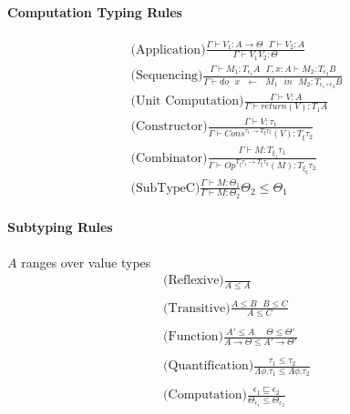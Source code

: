\documentclass[twoside,a4paper,11pt]{article}
\newcommand{\s}{\mbox{ }}
\newcommand{\subtype}{\leq}
\newcommand{\subeffect}{\sqsubseteq}
\newcommand{\typeJudgement}[2]{\Gamma\vdash #1 \colon #2}
\newcommand{\modVarTypeJudgement}[3]{\Gamma, #1 \vdash #2 \colon #3}
\newcommand{\conditionalTypeRule}[4]{\typeRule{#1}{#2}{#3} #4}
\newcommand{\typeRule}[3]{\displaystyle\mbox{#1}\frac{#2}{#3}}
\begin{document}
\paragraph{Computation Typing Rules}

\[\begin{array}{c}
\typeRule{(Application)}{\typeJudgement{V_1}{A \rightarrow \Theta}\s\typeJudgement{V_2}{A}}{\typeJudgement{V_1 V_2}{\Theta}}
\\
\typeRule{(Sequencing)}{\typeJudgement{M_1}{T_{\epsilon_1} A}\s\modVarTypeJudgement{x: A}{M_2}{T_{\epsilon_2} B}}{\typeJudgement{do \s x \s \leftarrow \s M_1 \s in \s M_2}{T_{\epsilon_1 \circ \epsilon_2} B}}
\\
\typeRule{(Unit Computation)}{\typeJudgement{V}{A}}{\typeJudgement{return(V)}{T_{1}A}}
\\
\typeRule{(Constructor)}{\typeJudgement{V}{\tau_1}}{\typeJudgement{ Cons^{\tau_1 \rightarrow T_{\xi} \tau_2}(V)}{T_{\xi} \tau_2}}
\\
\typeRule{(Combinator)}{\typeJudgement{M}{{T_{\xi_1} \tau_1}}}{\typeJudgement{ Op^{T_{\xi} \tau_1 \rightarrow T_{\xi} \tau_2}(M)}{{T_{\xi_2} \tau_2}}}
\\
\conditionalTypeRule{(SubTypeC)}{\typeJudgement{M}{\Theta_1}}{\typeJudgement{M}{\Theta_2}}{\Theta_2 \subtype \Theta_1}
\end{array}\]

\paragraph{Subtyping Rules}

$A$ ranges over value types
\[\begin{array}{c}

\typeRule{(Reflexive)}{}{A \subtype A}
\\
\\
\typeRule{(Transitive)}{A \subtype B\s B\subtype C}{A \subtype C}
\\
\\
\typeRule{(Function)}{A' \subtype A \s\s \Theta\subtype \Theta'}{A \rightarrow \Theta \subtype A' \rightarrow \Theta'}
\\
\\
\typeRule{(Quantification)}{\tau_1 \subtype \tau_2}{\Lambda \phi. \tau_1 \subtype \Lambda \phi. \tau_2}
\\
\\
\typeRule{(Computation)}{\epsilon_1 \subeffect \epsilon_2}{\Theta_{\epsilon_1} \subtype \Theta_{\epsilon_2}}

\end{array}\]
\end{document}
